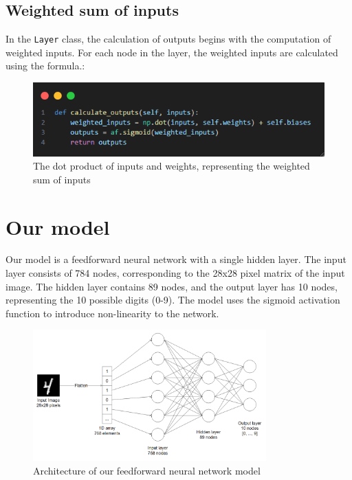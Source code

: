 \documentclass{article}
\begin{document}
\subsection{Weighted sum of inputs}
In the \texttt{Layer} class, the calculation of outputs begins with the computation of weighted inputs. For each node in the layer, the weighted inputs are calculated using the formula.:
\begin{figure}[ht]
    \centering
    \includegraphics[width=1\textwidth]{images/dot-product-of-inputs-and-weights.png}
    \caption{The dot product of inputs and weights, representing the weighted sum of inputs}
    \label{fig:weighted_sum}
\end{figure}

\newpage
\section{Our model}

Our model is a feedforward neural network with a single hidden layer. The input layer consists of 784 nodes, corresponding to the 28x28 pixel matrix of the input image. The hidden layer contains 89 nodes, and the output layer has 10 nodes, representing the 10 possible digits (0-9). The model uses the sigmoid activation function to introduce non-linearity to the network.
\begin{figure}[ht]
    \centering 
    \includegraphics[width=0.8\textwidth]{images/model.png}
    \caption{Architecture of our feedforward neural network model}
    \label{fig:model_architecture}
\end{figure}
\end{document}
